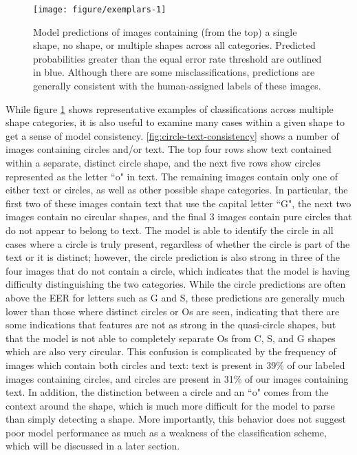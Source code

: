 \documentclass{article}\usepackage[]{graphicx}\usepackage[table]{xcolor}
\newenvironment{knitrout}{}{} %
\begin{document}
\begin{knitrout}
\color{fgcolor}\begin{figure}[p!]

{\centering \texttt{[image: figure/exemplars-1]} 

}

\caption[Model predictions of images containing (from the top) a single shape, no shape, or multiple shapes across all categories]{Model predictions of images containing (from the top) a single shape, no shape, or multiple shapes across all categories. Predicted probabilities greater than the equal error rate threshold are outlined in blue. Although there are some misclassifications, predictions are generally consistent with the human-assigned labels of these images.}\label{fig:exemplars}
\end{figure}


\end{knitrout}

While figure \ref{fig:exemplars} shows representative examples of classifications across multiple shape categories, it is also useful to examine many cases within a given shape to get a sense of model consistency. \autoref{fig:circle-text-consistency} shows a number of images containing circles and/or text. The top four rows show text contained within a separate, distinct circle shape, and the next five rows show circles represented as the letter ``o" in text. The remaining images contain only one of either text or circles, as well as other possible shape categories. In particular, the first two of these images contain text that use the capital letter ``G", the next two images contain no circular shapes, and the final 3 images contain pure circles that do not appear to belong to text. The model is able to identify the circle in all cases where a circle is truly present, regardless of whether the circle is part of the text or it is distinct; however, the circle prediction is also strong in three of the four images that do not contain a circle, which indicates that the model is having difficulty distinguishing the two categories. While the circle predictions are often above the EER for letters such as G and S, these predictions are generally much lower than those where distinct circles or Os are seen, indicating that there are some indications that features are not as strong in the quasi-circle shapes, but that the model is not able to completely separate Os from C, S, and G shapes which are also very circular. This confusion is complicated by the frequency of images which contain both circles and text: text is present in 39\% of our labeled images containing circles, and circles are present in 31\% of our images containing text. In addition, the distinction between a circle and an ``o" comes from the context around the shape, which is much more difficult for the model to parse than simply detecting a shape. More importantly, this behavior does not suggest poor model performance as much as a weakness of the classification scheme, which will be discussed in a later section.
\end{document}
